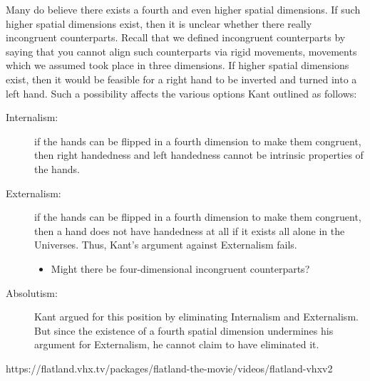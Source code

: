 \documentclass[oneside]{article}
\begin{document}
Many do believe there exists a fourth and even higher spatial dimensions. If such higher spatial dimensions exist, then it is unclear whether there really incongruent counterparts. Recall that we defined incongruent counterparts by saying that you cannot align such counterparts via rigid movements, movements which we assumed took place in three dimensions.  If higher spatial dimensions exist, then it would be feasible for a right hand to be inverted and turned into a left hand. Such a possibility affects the various options Kant outlined as follows: 


\begin{description}
\item[Internalism:]  if the hands can be flipped in a fourth dimension to make them congruent, then right handedness and left handedness cannot be intrinsic properties of the  hands.
\item[Externalism:] if the hands can be flipped in a fourth dimension to make them congruent, then 
a hand does not have handedness at all if it exists all alone in the Universes. Thus, Kant's argument against Externalism fails. 
\begin{itemize}
\item Might there be four-dimensional incongruent counterparts? 
\end{itemize}
\item[Absolutism:] Kant argued for this position by eliminating Internalism and Externalism. But since the existence of a fourth spatial dimension undermines his argument for Externalism, he cannot claim to have eliminated it. 
\end{description}



https://flatland.vhx.tv/packages/flatland-the-movie/videos/flatland-vhxv2
\end{document}
